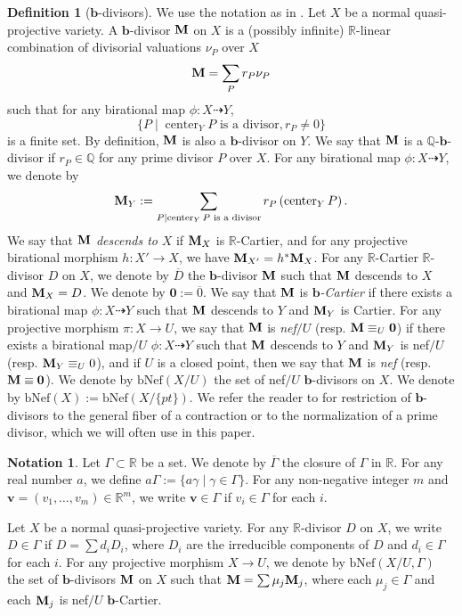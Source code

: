 \documentclass[11pt,reqno]{amsart}
\numberwithin{equation}{section}
\newcommand{\bb}{\bm{b}}
\newcommand{\Mm}{{\bf{M}}}
\newcommand{\Center}{\operatorname{center}}
\newcommand{\Ii}{\Gamma}
\newcommand{\bNef}{\mathrm{bNef}}
\theoremstyle{definition}
\newtheorem{defn}[thm]{Definition}
\newtheorem{nota}[thm]{Notation}
\begin{document}
\begin{defn}[$\bb$-divisors]
We use the notation as in \cite[Definition~2.4]{HL23a}. Let $X$ be a normal quasi-projective variety. A $\bb$-divisor $\Mm$ on $X$ is a (possibly infinite) $\mathbb R$-linear combination of divisorial valuations $\nu_P$ over $X$
\[\Mm=\sum_Pr_P\nu_P\]
such that for any birational map $\phi\colon X\dashrightarrow Y$, 
\[\{P\mid \Center_{Y}P\text{ is a divisor}, r_P\neq 0\}\]
is a finite set. By definition, $\Mm$ is also a $\bb$-divisor on $Y$. We say that $\Mm$ is a $\mathbb Q$-$\bb$-divisor if $r_P\in\mathbb Q$ for any prime divisor $P$ over $X$. For any birational map $\phi\colon X\dashrightarrow Y$, we denote by
\[\Mm_{Y}:=\sum_{P\mid \Center_{Y}P\text{ is a divisor}}r_P\left(\Center_{Y}P\right).\]
We say that $\Mm$ \emph{descends to} $X$ if $\Mm_{X}$ is $\mathbb R$-Cartier, and for any projective birational morphism $h\colon X'\rightarrow X$, we have $\Mm_{X'}=h^*\Mm_X$. For any $\mathbb R$-Cartier $\mathbb R$-divisor $D$ on $X$, we denote by $\overline{D}$ the $\bb$-divisor $\Mm$ such that $\Mm$ descends to $X$ and $\Mm_X=D$. We denote by $\bm{0}:=\overline{0}$. We say that $\Mm$ is \emph{$\bb$-Cartier} if there exists a birational map $\phi\colon X\dashrightarrow Y$ such that $\Mm$ descends to $Y$ and $\Mm_Y$ is Cartier. For any projective morphism $\pi: X\rightarrow U$, we say that $\Mm$ is \emph{nef$/U$} (resp. $\Mm\equiv_{U}\bm{0}$) if there exists a birational map$/U$ $\phi\colon X\dashrightarrow Y$ such that $\Mm$ descends to $Y$ and $\Mm_Y$ is nef$/U$ (resp. $\Mm_Y\equiv_{U}0$), and if $U$ is a closed point, then we say that $\Mm$ is \emph{nef} (resp. $\Mm\equiv\bm{0}$). We denote by $\bNef(X/U)$ the set of nef$/U$ $\bb$-divisors on $X$. We denote by $\bNef(X):=\bNef(X/\{pt\})$. We refer the reader to \cite[Remark~4.2(2), Definition~4.7]{BZ16} for restriction of $\bb$-divisors to the general fiber of a contraction or to the normalization of a prime divisor, which we will often use in this paper.
\end{defn}

\begin{nota}
Let $\Ii\subset\mathbb R$ be a set. 
We denote by $\overline{\Ii}$ the closure of $\Ii$ in $\mathbb R$. 
For any real number $a$, we define $a\Ii:=\{a\gamma\mid \gamma\in\Ii\}$. For any non-negative integer $m$ and $\bm{v}=(v_1,\dots,v_m)\in\mathbb R^m$, we write $\bm{v}\in\Ii$ if $v_i\in\Ii$ for each $i$.

Let $X$ be a normal quasi-projective variety. 
For any $\mathbb R$-divisor $D$ on $X$, we write $D\in\Ii$ if $D=\sum d_iD_i$, where $D_i$ are the irreducible components of $D$ and $d_i\in\Ii$ for each $i$. 
For any projective morphism $X\rightarrow U$, we denote by $\bNef(X/U,\Ii)$ the set of $\bb$-divisors $\Mm$ on $X$ such that $\Mm=\sum \mu_j\Mm_j$, where each $\mu_j\in\Ii$ and each $\Mm_j$ is nef$/U$ $\bb$-Cartier.
\end{nota}
\end{document}
